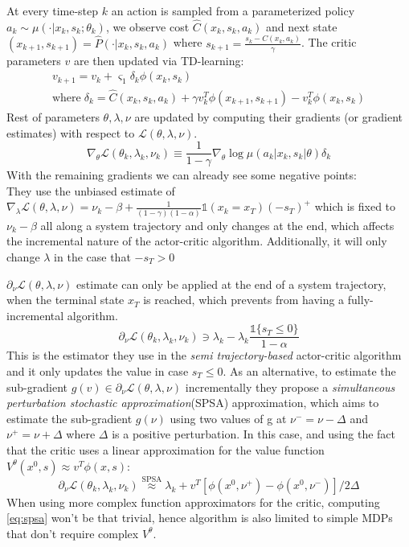 At every time-step $k$ an action is sampled from a parameterized policy $a_k \sim \mu(\cdot |x_k,s_k; \theta_k)$, we observe
cost $\hat{C}(x_k,s_k,a_k)$ and next state $(x_{k+1},s_{k+1})= \hat{P}(\cdot|x_k,s_k,a_k)$ where $s_{k+1}=\frac{s_k-C(x_k,a_k)}{\gamma}$.
The critic parameters $v$ are then updated via TD-learning:
\begin{align}
    v_{k+1}=v_k + \varsigma_1 \delta_k \phi(x_k, s_k) \\
    \text{where} \; \delta_k = \hat{C}(x_k,s_k,a_k) +
    \gamma v_k^T \phi(x_{k+1}, s_{k+1})-v_k^T\phi(x_{k}, s_{k})
\end{align}
Rest of parameters $\theta,\lambda,\nu$ are updated by computing their gradients (or gradient estimates) with respect 
to $\mathcal{L}(\theta,\lambda,\nu)$.
\begin{equation}
    \nabla_\theta\mathcal{L}(\theta_k,\lambda_k,\nu_k) \equiv \frac{1}{1-\gamma}\nabla_\theta\log\mu(a_k|x_k,s_k|\theta)\delta_k
\end{equation}
With the remaining gradients we can already see some negative points:\\
They use the unbiased estimate of $\nabla_\lambda  \mathcal{L}(\theta,\lambda,\nu) = 
\nu_k - \beta + \frac{1}{(1-\gamma)(1-\alpha)}\mathds{1}(x_k=x_T)(-s_T)^+$
which is fixed to $\nu_k - \beta$ all along a system trajectory and only changes at the end, which affects
the incremental nature of the actor-critic algorithm.
Additionally, it will only change $\lambda$ in the case that $-s_T>0$

$\partial_\nu  \mathcal{L}(\theta,\lambda,\nu) $ estimate can only be
applied at the end of a system trajectory, 
when the terminal state $x_T$ is reached, which prevents from having a fully-incremental algorithm.
\begin{equation}
    \partial_\nu  \mathcal{L}(\theta_k,\lambda_k,\nu_k) \ni \lambda_k - \lambda_k \frac{\mathds{1}\{s_T\leq 0\}}{1-\alpha}
\end{equation}
This is the estimator they use in the \textit{semi trajectory-based } actor-critic algorithm and it only updates the value 
in case $s_T\leq0$.
As an alternative, to estimate the sub-gradient $g(v) \in \partial_\nu  \mathcal{L}(\theta,\lambda,\nu) $ 
incrementally they propose a \textit{simultaneous perturbation stochastic approximation}(SPSA)
approximation, which aims to estimate the sub-gradient $g(\nu)$ using two values of 
g at $\nu^-=\nu- \Delta$ and $\nu^+=\nu + \Delta$ where $\Delta$ is a positive perturbation.
In this case, and using the fact that the critic uses a linear approximation for the value function $V^\theta(x^0,s) \approx  v^T\phi(x,s)$:
\begin{equation}
    \partial_\nu  \mathcal{L}(\theta_k,\lambda_k,\nu_k) \overset{\mathrm{SPSA}}{\approx} \lambda_k + v^T[\phi(x^0,\nu^+)-\phi(x^0,\nu^-)]/2\Delta \label{eq:spsa}
\end{equation}
When using more complex function approximators for the critic, computing \ref{eq:spsa} won't be that trivial, hence 
algorithm is also limited to simple MDPs that don't require complex $V^\theta$.

